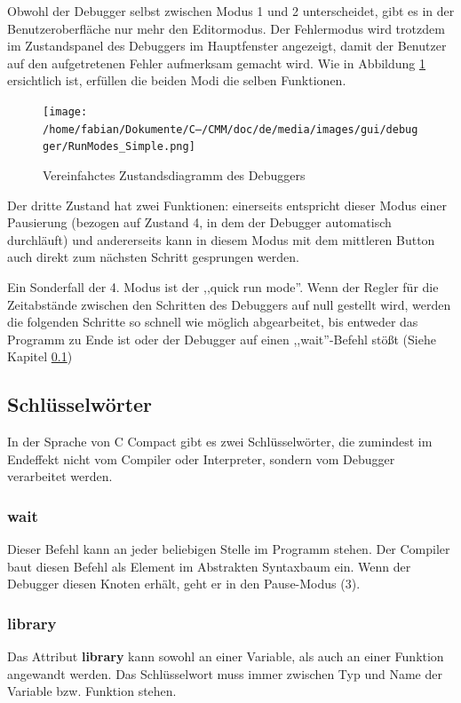 Obwohl der Debugger selbst zwischen Modus 1 und 2 unterscheidet, gibt es in der Benutzeroberfläche nur mehr den Editormodus. Der Fehlermodus wird trotzdem im Zustandspanel des Debuggers im Hauptfenster angezeigt, damit der Benutzer auf den aufgetretenen Fehler aufmerksam gemacht wird. Wie in Abbildung \ref{fig:deb-zust-simple} ersichtlich ist, erfüllen die beiden Modi die selben Funktionen.

\begin{figure}[htp]
\centering
\texttt{[image: /home/fabian/Dokumente/C--/CMM/doc/de/media/images/gui/debugger/RunModes\_Simple.png]}
\caption{Vereinfahctes Zustandsdiagramm des Debuggers}
\label{fig:deb-zust-simple}
\end{figure}

Der dritte Zustand hat zwei Funktionen: einerseits entspricht dieser Modus einer Pausierung (bezogen auf Zustand 4, in dem der Debugger automatisch durchläuft) und andererseits kann in diesem Modus mit dem mittleren Button auch direkt zum nächsten Schritt gesprungen werden.

Ein Sonderfall der 4. Modus ist der ,,quick run mode''. Wenn der Regler für die Zeitabstände zwischen den Schritten des Debuggers auf null gestellt wird, werden die folgenden Schritte so schnell wie möglich abgearbeitet, bis entweder das Programm zu Ende ist oder der Debugger auf einen ,,wait''-Befehl stößt (Siehe Kapitel \ref{})


\subsection{Schlüsselwörter}
In der Sprache von C Compact gibt es zwei Schlüsselwörter, die zumindest im Endeffekt nicht vom Compiler oder Interpreter, sondern vom Debugger verarbeitet werden.

\subsubsection*{wait}
Dieser Befehl kann an jeder beliebigen Stelle im Programm stehen. Der Compiler baut diesen Befehl als Element im Abstrakten Syntaxbaum ein. Wenn der Debugger diesen Knoten erhält, geht er in den Pause-Modus (3).

\subsubsection*{library}
Das Attribut \textbf{library} kann sowohl an einer Variable, als auch an einer Funktion angewandt werden. Das Schlüsselwort muss immer zwischen Typ und Name der Variable bzw. Funktion stehen.


